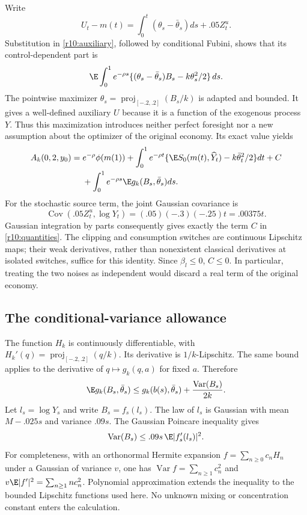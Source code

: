 Write
\[
 U_t-m(t)=\int_0^t(\theta_s-\bar\theta_s)ds+.05Z^u_t.
\]
Substitution in \eqref{r10:auxiliary}, followed by conditional Fubini, shows that its control-dependent part is
\[
 \E\int_0^1e^{-\rho s}
       \{(\theta_s-\bar\theta_s)B_s-k\theta_s^2/2\}\,ds.
\]
The pointwise maximizer $\theta_s=\operatorname{proj}_{[-.2,.2]}(B_s/k)$ is adapted and bounded. It gives a well-defined auxiliary $U$ because it is a function of the exogenous process $Y$. Thus this maximization introduces neither perfect foresight nor a new assumption about the optimizer of the original economy. Its exact value yields
\begin{align}
 A_k(0,2,y_0)={}&e^{-\rho}\phi(m(1))+
 \int_0^1e^{-\rho t}\{\E S_0(m(t),\widehat Y_t)-k\bar\theta_t^2/2\}dt+C\notag\\
 &+\int_0^1e^{-\rho s}\E g_k(B_s,\bar\theta_s)ds.\label{r10:exact-affine}
\end{align}
For the stochastic source term, the joint Gaussian covariance is
\[
 \operatorname{Cov}(.05Z^u_t,\log Y_t)
 =(.05)(-.3)(-.25)t=.00375t.
\]
Gaussian integration by parts consequently gives exactly the term $C$ in \eqref{r10:quantities}. The clipping and consumption switches are continuous Lipschitz maps; their weak derivatives, rather than nonexistent classical derivatives at isolated switches, suffice for this identity. Since $\beta_l\leq0$, $C\leq0$. In particular, treating the two noises as independent would discard a real term of the original economy.

\subsection{The conditional-variance allowance}
The function $H_k$ is continuously differentiable, with $H_k'(q)=\operatorname{proj}_{[-.2,.2]}(q/k)$. Its derivative is $1/k$-Lipschitz. The same bound applies to the derivative of $q\mapsto g_k(q,a)$ for fixed $a$. Therefore
\begin{equation}
 \E g_k(B_s,\bar\theta_s)
 \leq g_k(b(s),\bar\theta_s)+\frac{\operatorname{Var}(B_s)}{2k}.\label{r10:smooth-gap}
\end{equation}
Let $l_s=\log Y_s$ and write $B_s=f_s(l_s)$. The law of $l_s$ is Gaussian with mean $M-.025s$ and variance $.09s$. The Gaussian Poincare inequality gives
\[
 \operatorname{Var}(B_s)\leq .09s\,\E|f_s'(l_s)|^2.
\]
For completeness, with an orthonormal Hermite expansion $f=\sum_{n\geq0}c_nH_n$ under a Gaussian of variance $v$, one has $\operatorname{Var}f=\sum_{n\geq1}c_n^2$ and $v\E|f'|^2=\sum_{n\geq1}nc_n^2$. Polynomial approximation extends the inequality to the bounded Lipschitz functions used here. No unknown mixing or concentration constant enters the calculation.

